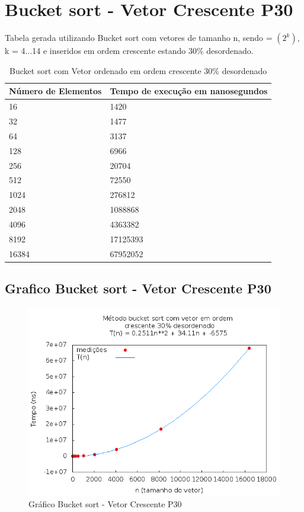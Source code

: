 \documentclass[12pt,a4paper,twoside]{report}
\begin{document}
\section{Bucket sort - Vetor Crescente P30}
Tabela gerada utilizando Bucket sort com vetores de tamanho n, sendo = $(2^k)$, k = 4...14 e inseridos em ordem crescente estando 30\% desordenado.

\begin{table}[H]
\centering
\caption{Bucket sort com Vetor ordenado em ordem crescente 30\% desordenado}
\label{my-label}
\begin{tabular}{|l|l|}
\hline
\multicolumn{1}{|c|}{\textbf{Número de Elementos}} & \multicolumn{1}{c|}{\textbf{Tempo de execução em nanosegundos}} \\ \hline
16 & 1420 \\ \hline
32 & 1477 \\ \hline
64 & 3137 \\ \hline
128 & 6966 \\ \hline
256 & 20704 \\ \hline
512 & 72550 \\ \hline
1024 & 276812 \\ \hline
2048 & 1088868 \\ \hline
4096 & 4363382 \\ \hline
8192 & 17125393 \\ \hline
16384 & 67952052 \\ \hline
\end{tabular}
\end{table}

\subsection{Grafico Bucket sort - Vetor Crescente P30}
\begin{figure}[H]
    \centering
    \includegraphics[width=0.7\linewidth]{graficos/Bucket/vIntCrescenteP30/vIntCrescenteP30.png}
  \caption{Gráfico Bucket sort - Vetor Crescente P30}
\end{figure}
\end{document}
